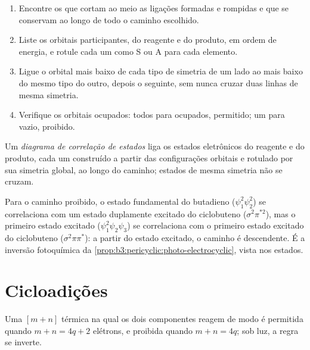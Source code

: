 \begin{method}\label{met:b3:pericyclic:correlation-diagram}
\begin{enumerate}
  \item Encontre os  que cortam ao meio as ligações formadas e rompidas e que se
        conservam ao longo de todo o caminho escolhido.
  \item Liste os orbitais participantes, do reagente e do produto, em ordem de
        energia, e rotule cada um como S ou A para cada elemento.
  \item Ligue o orbital mais baixo de cada tipo de simetria de um lado ao mais baixo
        do mesmo tipo do outro, depois o seguinte, sem nunca cruzar duas linhas de
        mesma simetria.
  \item Verifique os orbitais ocupados: todos para ocupados, permitido; um para vazio,
        proibido.
\end{enumerate}
\end{method}

\begin{definition}\label{def:b3:pericyclic:state-correlation}
Um \emph{diagrama de correlação de estados} liga os
estados eletrônicos do reagente e do produto, cada um construído a partir das configurações
orbitais e rotulado por sua simetria global, ao longo do caminho; estados de
mesma simetria não se cruzam.
\end{definition}

Para o caminho  proibido, o estado fundamental do butadieno ($\psi_1^2\psi_2^2$)
se correlaciona com um estado duplamente excitado do ciclobuteno ($\sigma^2\pi^{*2}$), mas o primeiro estado
excitado ($\psi_1^2\psi_2\psi_3$) se correlaciona com o primeiro estado excitado do ciclobuteno ($\sigma^2\pi\pi^*$): a partir do
estado excitado, o caminho  é descendente. É a inversão fotoquímica
da \cref{prop:b3:pericyclic:photo-electrocyclic}, vista nos estados.

\section{Cicloadições}

\begin{theorem}[Cicloadições]\label{thm:b3:pericyclic:cycloaddition}
Uma  $[m + n]$ térmica na qual os dois componentes reagem de modo  é
permitida quando $m + n = 4q + 2$ elétrons, e proibida quando $m + n = 4q$; sob luz, a
regra se inverte.
\end{theorem}

